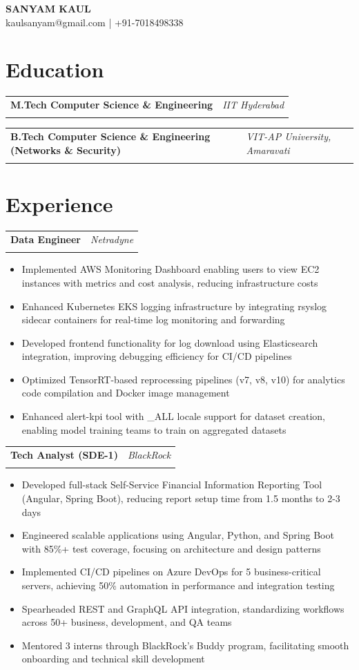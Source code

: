 \documentclass[11pt,a4paper]{article}
\makeatletter
\newcommand{\resumeItem}[1]{\item\small{#1}}
\newlength{\resumeLeftCol}
\newlength{\resumeRightCol}
\newcommand{\resumeHeading}[4]{
  \begin{tabular*}{\textwidth}{@{}p{\resumeLeftCol}@{\extracolsep{\fill}}>{\raggedleft\arraybackslash}p{\resumeRightCol}@{}}
    \textbf{#1} & \textit{#2} \\
    & \textit{\ifstrempty{#4}{#3}{#3 \ #4}}
  \end{tabular*}
  \vspace{-4pt}
}
\makeatother
\begin{document}
\begin{center}
    {\Huge\bfseries SANYAM KAUL} \\
    \vspace{2pt}
    \small kaulsanyam@gmail.com | +91-7018498338
\end{center}

\section{Education}
\resumeHeading{M.Tech Computer Science \& Engineering}{IIT Hyderabad}{2025}{CGPA: 8.90}
\resumeHeading{B.Tech Computer Science \& Engineering (Networks \& Security)}{VIT-AP University, Amaravati}{2021}{CGPA: 8.90}

\section{Experience}
\resumeHeading{Data Engineer}{Netradyne}{July 2025 - Present}{}
\begin{itemize}[leftmargin=*,noitemsep,topsep=0pt]
    \resumeItem{Implemented AWS Monitoring Dashboard enabling users to view EC2 instances with metrics and cost analysis, reducing infrastructure costs}
    \resumeItem{Enhanced Kubernetes EKS logging infrastructure by integrating rsyslog sidecar containers for real-time log monitoring and forwarding}
    \resumeItem{Developed frontend functionality for log download using Elasticsearch integration, improving debugging efficiency for CI/CD pipelines}
    \resumeItem{Optimized TensorRT-based reprocessing pipelines (v7, v8, v10) for analytics code compilation and Docker image management}
    \resumeItem{Enhanced alert-kpi tool with \_ALL locale support for dataset creation, enabling model training teams to train on aggregated datasets}
\end{itemize}

\resumeHeading{Tech Analyst (SDE-1)}{BlackRock}{July 2021 - June 2023}{}
\begin{itemize}[leftmargin=*,noitemsep,topsep=0pt]
    \resumeItem{Developed full-stack Self-Service Financial Information Reporting Tool (Angular, Spring Boot), reducing report setup time from 1.5 months to 2-3 days}
    \resumeItem{Engineered scalable applications using Angular, Python, and Spring Boot with 85\%+ test coverage, focusing on architecture and design patterns}
    \resumeItem{Implemented CI/CD pipelines on Azure DevOps for 5 business-critical servers, achieving 50\% automation in performance and integration testing}
    \resumeItem{Spearheaded REST and GraphQL API integration, standardizing workflows across 50+ business, development, and QA teams}
    \resumeItem{Mentored 3 interns through BlackRock's Buddy program, facilitating smooth onboarding and technical skill development}
\end{itemize}
\end{document}
